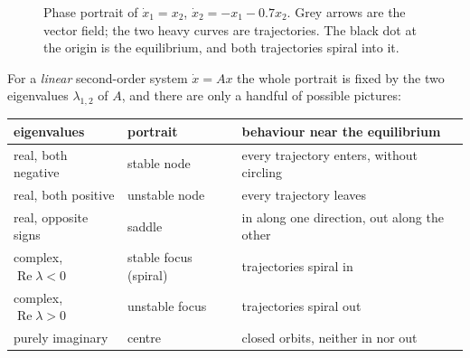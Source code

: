 \documentclass[11pt]{article}
\begin{document}
\begin{figure}[htb]
\centering
{}
\caption{Phase portrait of $\dot x_1=x_2$, $\dot x_2=-x_1-0.7x_2$. Grey arrows are
the vector field; the two heavy curves are trajectories. The black dot at the
origin is the equilibrium, and both trajectories spiral into it.}
\label{fig:phase}
\end{figure}

For a \emph{linear} second-order system $\dot x = Ax$ the whole portrait is fixed
by the two eigenvalues $\lambda_{1,2}$ of $A$, and there are only a handful of
possible pictures:

\begin{center}\small
\renewcommand{\arraystretch}{1.3}
\begin{tabular}{@{}lll@{}}
\toprule
eigenvalues & portrait & behaviour near the equilibrium\\
\midrule
real, both negative          & stable node     & every trajectory enters, without circling\\
real, both positive          & unstable node   & every trajectory leaves\\
real, opposite signs         & saddle          & in along one direction, out along the other\\
complex, $\operatorname{Re}\lambda<0$ & stable focus (spiral) & trajectories spiral in\\
complex, $\operatorname{Re}\lambda>0$ & unstable focus & trajectories spiral out\\
purely imaginary             & centre          & closed orbits, neither in nor out\\
\bottomrule
\end{tabular}
\end{center}
\end{document}
